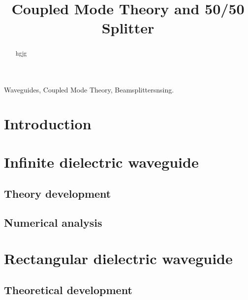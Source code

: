 \documentclass[conference, a4paper]{IEEEtran}
\begin{document}
\title{Coupled Mode Theory and 50/50 Splitter}

\author{
\and
{}
}

\maketitle

\begin{abstract}
    hgjg
\end{abstract}

\begin{IEEEkeywords}
    Waveguides, Coupled Mode Theory, Beamsplittersnsing.
\end{IEEEkeywords}

\section{Introduction}
\label{sec:intro}

\section{Infinite dielectric waveguide}
\label{sec:slab}

\subsection{Theory development}
\label{subsec:slab_theory}

\subsection{Numerical analysis}
\label{subsec:slab_num}

\section{Rectangular dielectric waveguide}
\label{subsec:rectangle}

\subsection{Theoretical development}
\label{subsec:rectangle_theory}
\end{document}
